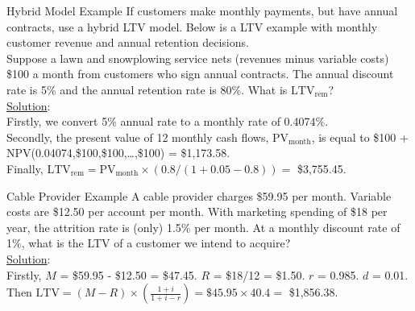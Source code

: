 \documentclass[pdf]{beamer}
\theoremstyle{remark}
\theoremstyle{definition}
\begin{document}
\begin{frame}[t]{Hybrid Model Example}
If customers make monthly payments, but have annual contracts, use a hybrid LTV model. Below is a LTV example with monthly customer revenue and annual retention decisions. \\
\vspace{1.5ex}
Suppose a lawn and snowplowing service nets (revenues minus variable costs) \$100 a month from customers who sign annual contracts. The annual discount rate is 5\% and the annual retention rate is 80\%. What is  $\text{LTV}_{\text{rem}}$? \\
\vspace{1.5ex}
\underline{Solution}: \\
\small
\vspace{1.5ex}
Firstly, we convert 5\% annual rate to a monthly rate of 0.4074\%. \\
\vspace{1.5ex}
 Secondly, the present value of 12 monthly cash flows, $\text{PV}_{\text{month}}$, is equal to  \$100 + NPV(0.04074,\$100,\$100,\ldots,\$100) = \$1,173.58. \\
\vspace{1.5ex}
 Finally, $\text{LTV}_{\text{rem}} = \text{PV}_{\text{month}} \times (0.8 / (1+0.05-0.8)) =$ \$3,755.45.
\end{frame}

\begin{frame}[t]{Cable Provider Example}
A cable provider charges \$59.95 per month. Variable costs are \$12.50 per account per month. With marketing spending of \$18 per year, the attrition rate is (only) 1.5\% per month. At a monthly discount rate of 1\%, what is the LTV of a customer we intend to acquire? \\ 
\vspace{1.5ex}
\underline{Solution}: \\
\vspace{1.5ex}
Firstly, $M$ = \$59.95 - \$12.50 =  \$47.45. $R$ = \$18/12 = \$1.50. $r$ = 0.985. $d$ = 0.01. \\
\vspace{1.5ex}
Then $\text{LTV} = (M - R) \times ( \frac{1+i}{1+i-r} ) = \$45.95 \times 40.4 = $ \$1,856.38. 
\end{frame}
\end{document}
